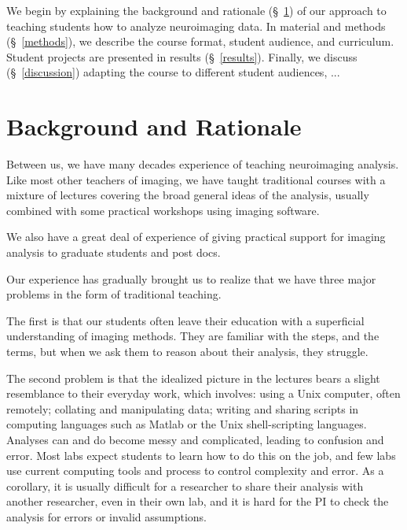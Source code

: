 

We begin by explaining the background and rationale (\S~\ref{background}) of
our approach to teaching students how to analyze neuroimaging data.
In material and methods (\S~\ref{methods}), we describe the course format, student audience,
and curriculum.
Student projects are presented in results (\S~\ref{results}).
Finally, we discuss (\S~\ref{discussion}) adapting the course to
different student audiences, ...

\section{Background and Rationale}\label{background}

Between us, we have many decades experience of teaching neuroimaging analysis.
Like most other teachers of imaging, we have taught traditional courses with a
mixture of lectures covering the broad general ideas of the analysis, usually
combined with some practical workshops using imaging software.

We also have a great deal of experience of giving practical support for
imaging analysis to graduate students and post docs.

Our experience has gradually brought us to realize that we have three major
problems in the form of traditional teaching.

The first is that our students often leave their education with a superficial
understanding of imaging methods.  They are familiar with the steps, and the
terms, but when we ask them to reason about their analysis, they struggle.

The second problem is that the idealized picture in the lectures bears a
slight resemblance to their everyday work, which involves: using a Unix
computer, often remotely; collating and manipulating data; writing and sharing
scripts in computing languages such as Matlab or the Unix shell-scripting
languages.  Analyses can and do become messy and complicated, leading to
confusion and error.  Most labs expect students to learn how to do this on the
job, and few labs use current computing tools and process to control 
complexity and error.  As a corollary, it is usually difficult for a
researcher to share their analysis with another researcher, even in their own
lab, and it is hard for the PI to check the analysis for errors or invalid
assumptions.

